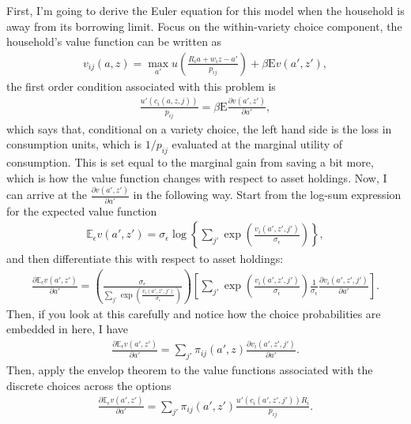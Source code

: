 \documentclass[12pt,pdftex]{article}
\begin{document}
\begin{onehalfspacing}
First, I'm going to derive the Euler equation for this model when the household is away from its borrowing limit. Focus on the within-variety choice component, the household's value function can be written as
\begin{align}
v_{ij}(a, z) = \max_{a'} u \left( \frac{R_i a + w_i z - a'}{p_{ij}} \right) + \beta  \mathrm{E} v(a', z'),
\end{align}
the first order condition associated with this problem is
\begin{align}
\frac{u'(c_{i}(a, z, j))}{p_{ij}} = \beta \mathrm{E} \frac{\partial v(a', z')}{\partial a'},
\end{align}
which says that, conditional on a variety choice, the left hand side is the loss in consumption units, which is $1 / p_{ij}$ evaluated at the marginal utility of consumption. This is set equal to the marginal gain from saving a bit more, which is how the value function changes with respect to asset holdings. Now, I can arrive at the $\frac{\partial v(a', z')}{\partial a'}$ in the following way. Start from the log-sum expression for the expected value function
\begin{align}
\mathbb{E}_{\epsilon} v(a', z') =  \sigma_{\epsilon} \log \left\{ \sum_{j'} \exp \left( \frac{  v_{i}(a', z', j')}{\sigma_{\epsilon}} \right) \right\},
\end{align}
and then differentiate this with respect to asset holdings:
\begin{align}
\frac{\partial \mathbb{E}_{\epsilon} v(a', z')}{\partial a'} = \left( \frac{\sigma_{\epsilon}}{\sum_{j'} \exp \left( \frac{  v_{i}(a', z', j')}{\sigma_{\epsilon}}\right)} \right)
\left[ \sum_{j'} \exp \left( \frac{  v_{i}(a', z', j')}{\sigma_{\epsilon}}\right) \frac{1}{\sigma_{\epsilon}} \frac{\partial v_{i}(a', z', j')}{\partial a'}  \right].
\end{align}
Then, if you look at this carefully and notice how the choice probabilities are embedded in here, I have
\begin{align}
\frac{\partial \mathbb{E}_{\epsilon} v(a', z')}{\partial a'} = \sum_{j'} \pi_{ij}(a', z) \frac{\partial v_{i}(a', z', j')}{\partial a'}.
\label{apx-eq:expected-value-fun-partial}
\end{align}
Then, apply the envelop theorem to the value functions associated with the discrete choices across the options
\begin{align}
\frac{\partial \mathbb{E}_{\epsilon} v(a', z')}{\partial a'} = \sum_{j'} \pi_{ij}(a', z') \frac{u'(c_{i}(a', z', j'))R_{i}}{p_{ij}}.

\end{align}
\end{onehalfspacing}
\end{document}
